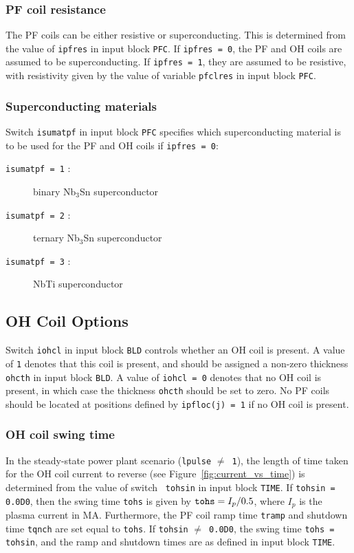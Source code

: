 \documentclass[11pt,a4paper]{report}
\begin{document}
\subsubsection{PF coil resistance}

The PF coils can be either resistive or superconducting. This is determined
from the value of {\tt ipfres} in input block {\tt PFC}. If {\tt ipfres = 0},
the PF and OH coils are assumed to be superconducting. If {\tt ipfres = 1},
they are assumed to be resistive, with resistivity given by the value of
variable {\tt pfclres} in input block {\tt PFC}.

\subsubsection{Superconducting materials}

Switch {\tt isumatpf} in input block {\tt PFC} specifies which superconducting
material is to be used for the PF and OH coils if {\tt ipfres = 0}:
\begin{description}
\item [{\tt isumatpf = 1} :] binary Nb$_3$Sn superconductor
\item [{\tt isumatpf = 2} :] ternary Nb$_3$Sn superconductor
\item [{\tt isumatpf = 3} :] NbTi superconductor
\end{description}

\subsection{OH Coil Options}

Switch {\tt iohcl} in input block {\tt BLD} controls whether an OH coil is
present. A value of {\tt 1} denotes that this coil is present, and should be
assigned a non-zero thickness {\tt ohcth} in input block {\tt BLD}. A value of
{\tt iohcl = 0} denotes that no OH coil is present, in which case the
thickness {\tt ohcth} should be set to zero. No PF coils should be located
at positions defined by {\tt ipfloc(j)~=~1} if no OH coil is present.

\subsubsection{OH coil swing time}
\label{sec:tohs}

In the steady-state power plant scenario ({\tt lpulse} $\not=$~{\tt 1}), the
length of time taken for the OH coil current to reverse (see
Figure~\ref{fig:current_vs_time}) is determined from the value of switch {\tt
tohsin} in input block {\tt TIME}. If {\tt tohsin = 0.0D0}, then the swing
time {\tt tohs} is given by $\mbox{\tt tohs} = I_p / 0.5$, where $I_p$ is the
plasma current in MA\@. Furthermore, the PF coil ramp time {\tt tramp} and
shutdown time {\tt tqnch} are set equal to {\tt tohs}.  If {\tt tohsin}
$\not=$~{\tt 0.0D0}, the swing time {\tt tohs = tohsin}, and the ramp and
shutdown times are as defined in input block {\tt TIME}.
\setlength{\parskip}{5mm}
\end{document}
